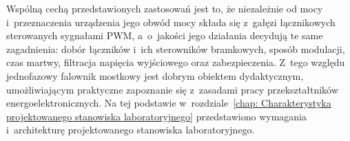 Wspólną cechą przedstawionych zastosowań jest to, że niezależnie od mocy
i~przeznaczenia urządzenia jego obwód mocy składa się z~gałęzi łącznikowych
sterowanych sygnałami PWM, a~o~jakości jego działania decydują te same
zagadnienia: dobór łączników i~ich sterowników bramkowych, sposób modulacji,
czas martwy, filtracja napięcia wyjściowego oraz zabezpieczenia. Z~tego
względu jednofazowy falownik mostkowy jest dobrym obiektem dydaktycznym,
umożliwiającym praktyczne zapoznanie się z~zasadami pracy przekształtników
energoelektronicznych. Na tej podstawie w~rozdziale~\ref{chap: Charakterystyka projektowanego stanowiska laboratoryjnego}
przedstawiono wymagania i~architekturę projektowanego stanowiska
laboratoryjnego.
